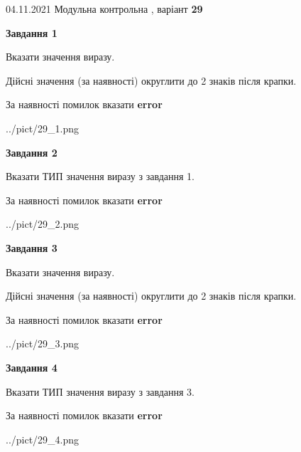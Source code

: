 \documentclass[11pt, ukrainian]{article}
\begin{document}
{04.11.2021 Модульна контрольна , варіант  \No \textbf { 29 }\par}
{
\begin {large}
{\begin {center}\textbf{Завдання 1}\end {center}}\par
Вказати значення виразу. \par
Дійсні значення (за наявності) округлити до 2 знаків після крапки. \par
За наявності помилок вказати \textbf{error}

\begin{center}
	{../pict/29_1.png}
\end{center}
\newpage

{\begin {center}\textbf{Завдання 2}\end {center}}\par
Вказати ТИП значення виразу з завдання 1. \par
За наявності помилок вказати \textbf{error}

\begin{center}
	{../pict/29_2.png}
\end{center}
\newpage

{\begin {center}\textbf{Завдання 3}\end {center}}\par
Вказати значення виразу. \par
Дійсні значення (за наявності) округлити до 2 знаків після крапки. \par
За наявності помилок вказати \textbf{error}

\begin{center}
	{../pict/29_3.png}
\end{center}
\newpage

{\begin {center}\textbf{Завдання 4}\end {center}}\par
Вказати ТИП значення виразу з завдання 3. \par
За наявності помилок вказати \textbf{error}

\begin{center}
	{../pict/29_4.png}
\end{center}
\newpage


\end{large}}
\end{document}
